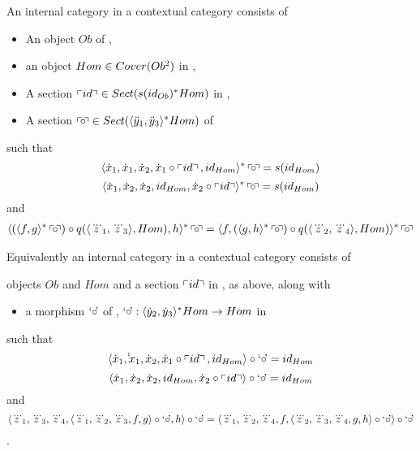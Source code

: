 \begin{lemma}
An internal category in a contextual category \catcw consists of
\begin{itemize}
\item An object $Ob$ of \catc,
\item an object $Hom \in Cover(Ob^2)$ in \catc,
\item A section $\left\ulcorner id\right\urcorner \in Sect(s(id_{Ob})^*Hom)$ in \catc, 
\item A section $\left\ulcorner\kern-2pt\circ \kern-2pt\right\urcorner \in Sect(\langle\ddot y_1,\ddot y_3\rangle^*Hom) $ of \catc 											
\end{itemize}
such that
\begin{equation}
\label{leftidentityaxiom}
\leftidentitymapped
\end{equation}
\begin{equation}
\label{rightidentityaxiom}
\rightidentitymapped
\end{equation}
and
\begin{multline}
\label{associativityaxiom}
\assoclhsremapped = \assocrhsremapped
\end{multline}


Equivalently an internal category in a contextual category \catcw consists of
\item objects $Ob$ and  $Hom$  and a section $\left\ulcorner id\right\urcorner$ in \catc,  as above, along with
\begin{itemize}
\item a morphism $\text{`$\circ$\kern-2pt'}$ of \catc, $\text{`$\circ$\kern-2pt'}: \langle\dot y_2,\dot y_3\rangle^*Hom \rightarrow Hom$ in \catc
\end{itemize}
such that
\begin{equation}
\label{leftidentityrepresentation2}
\tuple{\dot x_1,\dot \dot x_1,\dot x_2,\dot x_1\circ \fid,id_{Hom}} \circ \compmorph =id_{Hom}
\end{equation}
\begin{equation}
\label{rightidentityrepresentation2}
\tuple{\dot x_1,\dot x_2,\dot x_2,id_{Hom},\dot x_2 \circ \fid} \circ \compmorph =id_{Hom}
\end{equation}
and
\begin{equation}
\label{associativityrepresentation2}
\assocequivalentlhs = \assocequivalentrhs
\end{equation}.
\end{lemma}
